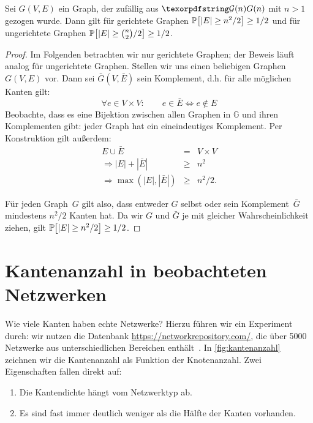\begin{observation}
    Sei $G(V,E)$ ein Graph, der zufällig aus $\Gn$ mit $n > 1$ gezogen wurde.
    Dann gilt für gerichtete Graphen $\mathbb{P}\!\left[|E| \ge n^2 / 2\right] \ge 1/2$ und für ungerichtete Graphen $\mathbb{P}\!\left[|E| \ge \binom{n}{2} / 2\right] \ge 1/2$.
\end{observation}

\begin{proof}
    Im Folgenden betrachten wir nur gerichtete Graphen; der Beweis läuft analog für ungerichtete Graphen.
    Stellen wir uns einen beliebigen Graphen~$G(V, E)$ vor.
    Dann sei $\bar G(V, \bar E)$ sein Komplement, d.h. für alle möglichen Kanten gilt:
    \begin{equation}
        \forall e \in V\times V\colon \quad\quad e \in \bar E \Leftrightarrow e \notin E
    \end{equation}
    Beobachte, dass es eine Bijektion zwischen allen Graphen in $\mathbb G$ und ihren Komplementen gibt: jeder Graph hat ein eineindeutiges Komplement.
    Per Konstruktion gilt außerdem:
    \begin{eqnarray}
        E \cup \bar E &=& V \times V\\
        \Rightarrow |E| + |\bar E| &\ge& n^2\\
        \Rightarrow \max(|E|, |\bar E|) &\ge& n^2 / 2.
    \end{eqnarray}

    Für jeden Graph~$G$ gilt also, dass entweder $G$ selbst oder sein Komplement~$\bar G$ mindestens $n^2 / 2$ Kanten hat.
    Da wir $G$ und $\bar G$ je mit gleicher Wahrscheinlichkeit ziehen, gilt $\mathbb{P}\!\left[|E| \ge n^2 / 2\right] \ge 1/2$.
\end{proof}

\section{Kantenanzahl in beobachteten Netzwerken}\label{sec:kanten-in-beobachteten-netzen}
Wie viele Kanten haben echte Netzwerke? Hierzu führen wir ein Experiment durch:
wir nutzen die Datenbank \url{https://networkrepository.com/}, die über 5000 Netzwerke aus unterschiedlichen Bereichen enthält~\cite{networkrepository}.
In \cref{fig:kantenanzahl} zeichnen wir die Kantenanzahl als Funktion der Knotenanzahl.
Zwei Eigenschaften fallen direkt auf:
\begin{enumerate}
    \item Die Kantendichte hängt vom Netzwerktyp ab.
    \item Es sind fast immer deutlich weniger als die Hälfte der Kanten vorhanden.
\end{enumerate}

